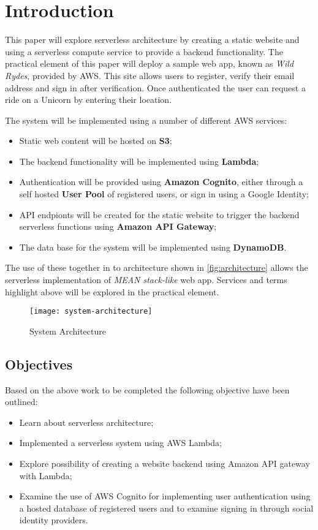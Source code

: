   \section{Introduction}
  This paper will explore serverless architecture by creating a static website and using a serverless compute service to provide a backend functionality. The practical element of this paper will deploy a sample web app, known as \textit{Wild Rydes}, provided by AWS. This site allows users to register, verify their email address and sign in after verification. Once authenticated the user can request a ride on a Unicorn by entering their location.
  
  The system will be implemented using a number of different AWS services:
  \begin{itemize}
    \item Static web content will be hosted on \textbf{S3};
    \item The backend functionality will be implemented using \textbf{Lambda};
    \item Authentication will be provided using \textbf{Amazon Cognito}, either through a self hosted \textbf{User Pool} of registered users, or sign in using a Google Identity;
    \item API endpionts will be created for the static website to trigger the backend serverless functions using \textbf{Amazon API Gateway};
    \item The data base for the system will be implemented using \textbf{DynamoDB}.
  \end{itemize}
  
  The use of these together in to architecture shown in \autoref{fig:architecture} allows the serverless implementation of \textit{MEAN stack-like} web app. Services and terms highlight above will be explored in the practical element.
  
    
  \begin{figure}[H]
    \caption{System Architecture}
    \centering
    \texttt{[image: system-architecture]}
    \label{fig:architecture}
  \end{figure}
  
   
  \subsection{Objectives}
  Based on the above work to be completed the following objective have been outlined:
  
  \begin{itemize}
    \item Learn about serverless architecture;
    \item Implemented a serverless system using AWS Lambda;
    \item Explore possibility of creating a website backend using Amazon API gateway with Lambda;
    \item Examine the use of AWS Cognito for implementing user authentication using a hosted database of registered users and to examine signing in through social identity providers.
  \end{itemize} 
  
